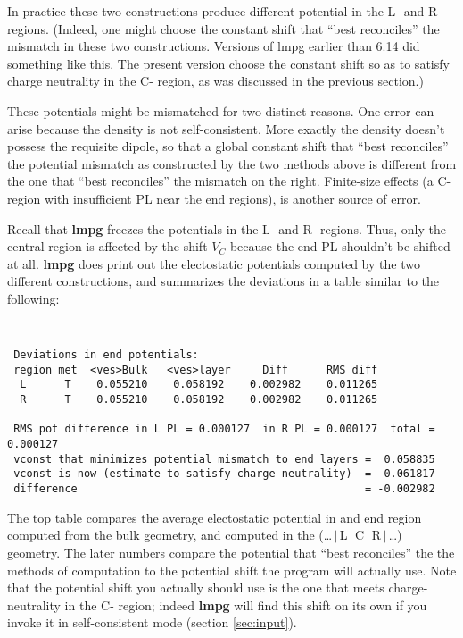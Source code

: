 \documentclass{article}
\begin{document}
In practice these two constructions produce different potential
in the L- and R- regions.  (Indeed, one might choose the constant
shift that ``best reconciles'' the mismatch in these two
constructions.  Versions of lmpg earlier than 6.14 did something
like this.  The present version choose the constant shift so as
to satisfy charge neutrality in the C- region, as was discussed
in the previous section.)

These potentials might be mismatched for two distinct reasons.
One error can arise because the density is not self-consistent.
More exactly the density doesn't possess the requisite dipole, so
that a global constant shift that ``best reconciles'' the
potential mismatch as constructed by the two methods above is
different from the one that ``best reconciles'' the mismatch on
the right.  Finite-size effects (a C- region with insufficient PL
near the end regions), is another source of error.

Recall that {\bf lmpg} freezes the potentials in the L- and R-
regions.  Thus, only the central region is affected by the shift
$V_C$ because the end PL shouldn't be shifted at all.  {\bf lmpg}
does print out the electostatic potentials computed by the two
different constructions, and summarizes the deviations in a
table similar to the following: {\tt\small
\begin{verbatim}
 Deviations in end potentials:
 region met  <ves>Bulk   <ves>layer     Diff      RMS diff
  L      T    0.055210    0.058192    0.002982    0.011265
  R      T    0.055210    0.058192    0.002982    0.011265

 RMS pot difference in L PL = 0.000127  in R PL = 0.000127  total = 0.000127
 vconst that minimizes potential mismatch to end layers =  0.058835
 vconst is now (estimate to satisfy charge neutrality)  =  0.061817
 difference                                             = -0.002982
\end{verbatim}

}

The top table compares the average electostatic potential in and
end region computed from the bulk geometry, and computed in the
(\dots\,$|$\,L\,$|$\,C\,$|$\,R\,$|$\,\dots) geometry.
The later numbers compare the potential that ``best reconciles''
the the methods of computation to the potential shift the program
will actually use.  Note that the potential shift you actually
should use is the one that meets charge-neutrality in the C-
region; indeed {\bf lmpg} will find this shift on its own if you
invoke it in self-consistent mode (section \ref{sec:input}).
\end{document}
